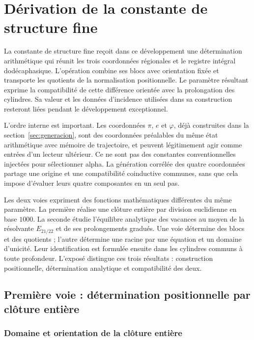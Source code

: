 \section{Dérivation de la constante de structure fine}
\label{sec:alpha}

La constante de structure fine reçoit dans ce développement une détermination arithmétique qui réunit les trois coordonnées régionales et le registre intégral dodécaphasique. L'opération combine ses blocs avec orientation fixée et transporte les quotients de la normalisation positionnelle. Le paramètre résultant exprime la compatibilité de cette différence orientée avec la prolongation des cylindres. Sa valeur et les données d'incidence utilisées dans sa construction resteront liées pendant le développement exceptionnel.

L’ordre interne est important. Les coordonnées \(\pi\),
\(e\) et \(\varphi\), déjà construites dans la section~\ref{sec:generacion}, sont des coordonnées
préalables du même état arithmétique avec mémoire de trajectoire, et peuvent légitimement agir comme
entrées d’un lecteur ultérieur. Ce ne sont pas des constantes conventionnelles
injectées pour sélectionner alpha. La génération corrélée des quatre coordonnées partage une origine et une
compatibilité coinductive communes, sans que cela impose d’évaluer leurs quatre
composantes en un seul pas.

Les deux voies expriment des fonctions mathématiques différentes du même paramètre.
La première réalise une clôture entière par division euclidienne en base
\(1000\). La seconde étudie l’équilibre analytique des vacances au moyen
de la résolvante \(E_{21/22}\) et de ses prolongements gradués. Une voie
détermine des blocs et des quotients ; l’autre détermine une racine par une
équation et un domaine d’unicité. Leur identification est formulée ensuite
dans les cylindres communs à toute profondeur. L’exposé distingue
ces trois résultats : construction positionnelle, détermination analytique
et compatibilité des deux.

\subsection{Première voie : détermination positionnelle par clôture entière}
\subsubsection{Domaine et orientation de la clôture entière}
\label{subsec:alpha-dominio}

